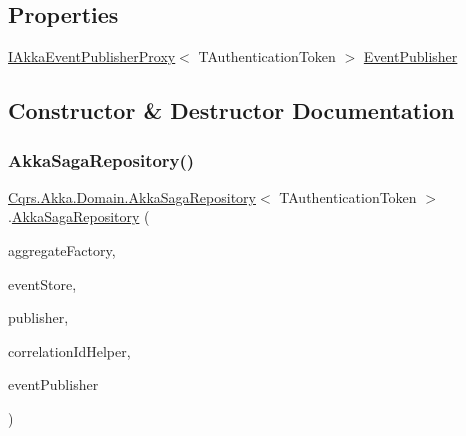 \subsection*{Properties}
\begin{DoxyCompactItemize}
\item 
\hyperlink{interfaceCqrs_1_1Akka_1_1Events_1_1IAkkaEventPublisherProxy}{I\+Akka\+Event\+Publisher\+Proxy}$<$ T\+Authentication\+Token $>$ \hyperlink{classCqrs_1_1Akka_1_1Domain_1_1AkkaSagaRepository_a25957859d1f98ea7f434983c562e9724_a25957859d1f98ea7f434983c562e9724}{Event\+Publisher}
\end{DoxyCompactItemize}


\subsection{Constructor \& Destructor Documentation}
\mbox{\label{classCqrs_1_1Akka_1_1Domain_1_1AkkaSagaRepository_a8297f64e2b7a7be7bcc999c89dcece05_a8297f64e2b7a7be7bcc999c89dcece05}} 
\subsubsection{\texorpdfstring{Akka\+Saga\+Repository()}{AkkaSagaRepository()}}
{\footnotesize\ttfamily \hyperlink{classCqrs_1_1Akka_1_1Domain_1_1AkkaSagaRepository}{Cqrs.\+Akka.\+Domain.\+Akka\+Saga\+Repository}$<$ T\+Authentication\+Token $>$.\hyperlink{classCqrs_1_1Akka_1_1Domain_1_1AkkaSagaRepository}{Akka\+Saga\+Repository} (\begin{DoxyParamCaption}\item[{\hyperlink{interfaceCqrs_1_1Domain_1_1Factories_1_1IAggregateFactory}{I\+Aggregate\+Factory}}]{aggregate\+Factory,  }\item[{\hyperlink{interfaceCqrs_1_1Events_1_1IEventStore}{I\+Event\+Store}$<$ T\+Authentication\+Token $>$}]{event\+Store,  }\item[{\hyperlink{interfaceCqrs_1_1Events_1_1IEventPublisher}{I\+Event\+Publisher}$<$ T\+Authentication\+Token $>$}]{publisher,  }\item[{I\+Correlation\+Id\+Helper}]{correlation\+Id\+Helper,  }\item[{\hyperlink{interfaceCqrs_1_1Akka_1_1Events_1_1IAkkaEventPublisherProxy}{I\+Akka\+Event\+Publisher\+Proxy}$<$ T\+Authentication\+Token $>$}]{event\+Publisher }\end{DoxyParamCaption})}




